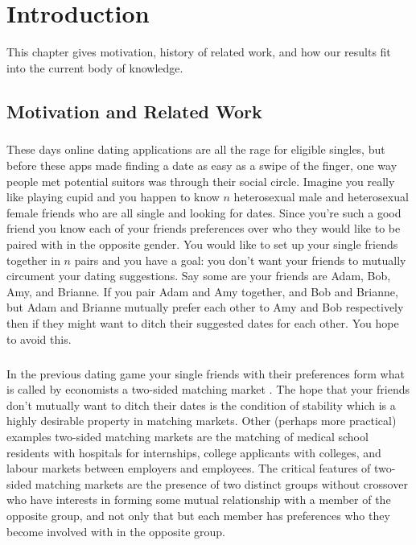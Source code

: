 \chapter{Introduction}
This chapter gives motivation, history of related work, and how our results fit into the current body of knowledge.

\section{Motivation and Related Work}

\paragraph{}
These days online dating applications are all the rage for eligible singles, but before these apps made finding a date as easy as a swipe of the finger, one way people met potential suitors was through their social circle. Imagine you really like playing cupid and you happen to know $n$ heterosexual male and heterosexual female friends who are all single and looking for dates. Since you're such a good friend you know each of your friends preferences over who they would like to be paired with in the opposite gender. You would like to set up your single friends together in $n$ pairs and you have a goal: you don't want your friends to mutually circument your dating suggestions. Say some are your friends are Adam, Bob, Amy, and Brianne. If you pair Adam and Amy together, and Bob and Brianne, but Adam and Brianne mutually prefer each other to Amy and Bob respectively then if they might want to ditch their suggested dates for each other. You hope to avoid this.
\paragraph{}
In the previous dating game your single friends with their preferences form what is called by economists a two-sided matching market \cite{roth1992two}. The hope that your friends don't mutually want to ditch their dates is the condition of stability which is a highly desirable property in matching markets. Other (perhaps more practical) examples two-sided matching markets are the matching of medical school residents with hospitals for internships, college applicants with colleges, and labour markets between employers and employees. The critical features of two-sided matching markets are the presence of two distinct groups without crossover who have interests in forming some mutual relationship with a member of the opposite group, and not only that but each member has preferences who they become involved with in the opposite group.

